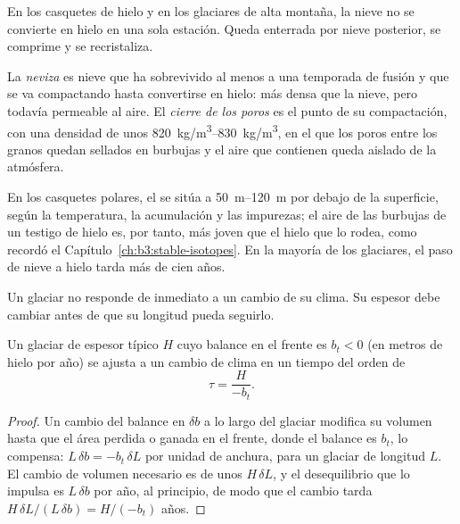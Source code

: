 En los casquetes de hielo y en los glaciares de alta montaña, la nieve no se convierte en hielo en una
sola estación. Queda enterrada por nieve posterior, se comprime y se recristaliza.

\begin{definition}\label{def:b3:glaciology:firn}
La \emph{neviza} es nieve que ha sobrevivido al menos a una temporada de fusión
y que se va compactando hasta convertirse en hielo: más densa que la nieve, pero todavía permeable al aire.
El \emph{cierre de los poros} es el punto de su
compactación, con una densidad de unos \qtyrange{820}{830}{kg/m^3}, en el que los poros
entre los granos quedan sellados en burbujas y el aire que contienen queda
aislado de la atmósfera.
\end{definition}

En los casquetes polares, el  se sitúa a \qtyrange{50}{120}{m} por debajo de la
superficie, según la temperatura, la acumulación y las
impurezas; el aire de las burbujas de un testigo de hielo es, por tanto, más joven que el
hielo que lo rodea, como recordó el Capítulo~\ref{ch:b3:stable-isotopes}. En la mayoría de los
glaciares, el paso de nieve a hielo tarda más de cien años.

Un glaciar no responde de inmediato a un cambio de su clima. Su espesor
debe cambiar antes de que su longitud pueda seguirlo.

\begin{proposition}\label{prop:b3:glaciology:response}
Un glaciar de espesor típico $H$ cuyo balance en el frente es $b_t <
0$ (en metros de hielo por año) se ajusta a un cambio de clima en un tiempo del
orden de
\[
\tau = \frac{H}{-b_t} .
\]
\end{proposition}

\begin{proof}
Un cambio del balance en $\delta b$ a lo largo del glaciar modifica su volumen
hasta que el área perdida o ganada en el frente, donde el balance es $b_t$, lo compensa:
$L\,\delta b = -b_t\,\delta L$ por unidad de anchura, para un glaciar
de longitud $L$. El cambio de volumen necesario es de unos $H\,\delta L$, y
el desequilibrio que lo impulsa es $L\,\delta b$ por año, al principio, de modo que el
cambio tarda $H\,\delta L/(L\,\delta b) = H/(-b_t)$ años.
\end{proof}

